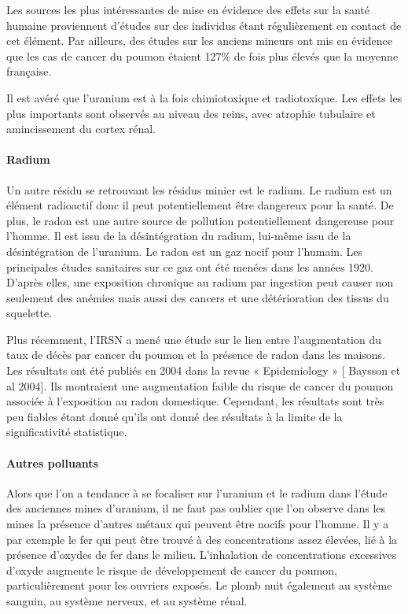 \documentclass{article}
\begin{document}
Les sources les plus intéressantes de mise en évidence des effets sur la santé humaine proviennent d'études sur des individus étant régulièrement en contact de cet élément. Par ailleurs, des études sur les anciens mineurs ont mis en évidence que les cas de cancer du poumon étaient 127\% de fois plus élevés que la moyenne française. 

Il est avéré que l'uranium est à la fois chimiotoxique et radiotoxique. Les effets les plus importants sont observés au niveau des reins, avec atrophie tubulaire et amincissement du cortex rénal.

\paragraph{Radium}

Un autre résidu se retrouvant les résidus minier est le radium. Le radium est un élément radioactif donc il peut potentiellement être dangereux pour la santé. De plus, le radon est une autre source de pollution potentiellement dangereuse pour l’homme. Il est issu de la désintégration du radium, lui-même issu de la désintégration de l'uranium. Le radon est un gaz nocif pour l’humain. Les principales études sanitaires sur ce gaz ont été menées dans les années 1920. D’après elles, une exposition chronique au radium par ingestion peut causer non seulement des anémies mais aussi des cancers et une détérioration des tissus du squelette.

Plus récemment, l’IRSN a mené une étude sur le lien entre l’augmentation du taux de décès par cancer du poumon et la présence de radon dans les maisons. Les résultats ont été publiés en 2004 dans la revue « Epidemiology » [ Baysson et al 2004]. Ils montraient une augmentation faible du risque de cancer du poumon associée à l’exposition au radon  domestique. Cependant, les résultats sont très peu fiables étant donné qu’ils ont donné des résultats à la limite de la significativité statistique.  

\paragraph{Autres polluants}

Alors que l’on a tendance à se focaliser sur l’uranium et le radium dans l’étude des anciennes mines d’uranium, il ne faut pas oublier que l’on observe dans les mines la présence d'autres métaux qui peuvent être nocifs pour l’homme. Il y a par exemple le fer qui peut être trouvé à des concentrations assez élevées, lié à la présence d'oxydes de fer dans le milieu.  L'inhalation de concentrations excessives d'oxyde augmente le risque de développement de cancer du poumon, particulièrement pour les ouvriers exposés. Le plomb nuit également au système sanguin, au système nerveux, et au système rénal.
\end{document}
